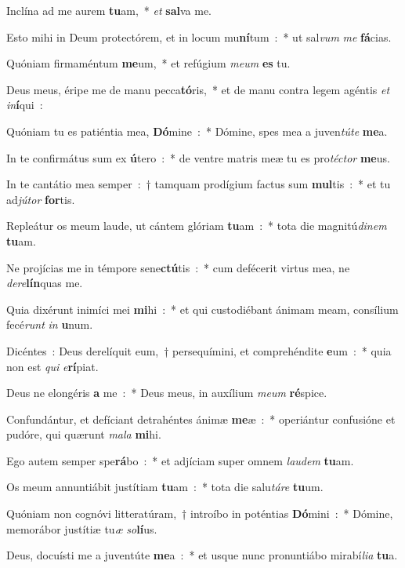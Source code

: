 ﻿\item Inclína ad me aurem \textbf{tu}am,~* \emph{et} \textbf{sal}va me.
\item Esto mihi in Deum protectórem, et in locum mu\textbf{ní}tum~:~* ut sal\emph{vum} \emph{me} \textbf{fá}cias.
\item Quóniam firmaméntum \textbf{me}um,~* et refúgium \emph{me}\emph{um} \textbf{es} tu.
\item Deus meus, éripe me de manu pecca\textbf{tó}ris,~* et de manu contra legem agéntis \emph{et} \emph{in}\textbf{í}qui~:
\item Quóniam tu es patiéntia mea, \textbf{Dó}mine~:~* Dómine, spes mea a juven\emph{tú}\emph{te} \textbf{me}a.
\item In te confirmátus sum ex \textbf{ú}tero~:~* de ventre matris meæ tu es pro\emph{té}\emph{ctor} \textbf{me}us.
\item In te cantátio mea semper~:~† tamquam prodígium factus sum \textbf{mul}tis~:~* et tu ad\emph{jú}\emph{tor} \textbf{for}tis.
\item Repleátur os meum laude, ut cántem glóriam \textbf{tu}am~:~* tota die magnitú\emph{di}\emph{nem} \textbf{tu}am.
\item Ne projícias me in témpore sene\textbf{ctú}tis~:~* cum defécerit virtus mea, ne \emph{de}\emph{re}\textbf{lín}quas me.
\item Quia dixérunt inimíci mei \textbf{mi}hi~:~* et qui custodiébant ánimam meam, consílium fecé\emph{runt} \emph{in} \textbf{u}num.
\item Dicéntes~: Deus derelíquit eum,~† persequímini, et comprehéndite \textbf{e}um~:~* quia non est \emph{qui} \emph{e}\textbf{rí}piat.
\item Deus ne elongéris \textbf{a} me~:~* Deus meus, in auxílium \emph{me}\emph{um} \textbf{ré}spice.
\item Confundántur, et defíciant detrahéntes ánimæ \textbf{me}æ~:~* operiántur confusióne et pudóre, qui quærunt \emph{ma}\emph{la} \textbf{mi}hi.
\item Ego autem semper spe\textbf{rá}bo~:~* et adjíciam super omnem \emph{lau}\emph{dem} \textbf{tu}am.
\item Os meum annuntiábit justítiam \textbf{tu}am~:~* tota die salu\emph{tá}\emph{re} \textbf{tu}um.
\item Quóniam non cognóvi litteratúram,~† introíbo in poténtias \textbf{Dó}mini~:~* Dómine, memorábor justítiæ tu\emph{æ} \emph{so}\textbf{lí}us.
\item Deus, docuísti me a juventúte \textbf{me}a~:~* et usque nunc pronuntiábo mirabí\emph{li}\emph{a} \textbf{tu}a.
